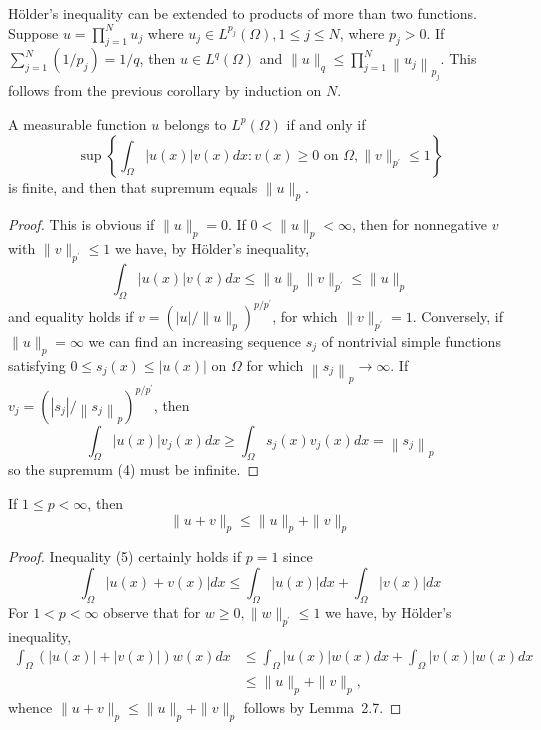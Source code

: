 \begin{corollary}
  Hölder's inequality can be extended to products of more than two functions. Suppose $u=\prod_{j=1}^N u_j$ where $u_j \in L^{p_j}(\Omega), 1 \leq j \leq N$, where $p_j>0$. If $\sum_{j=1}^N\left(1 / p_j\right)=1 / q$, then $u \in L^q(\Omega)$ and $\|u\|_q \leq \prod_{j=1}^N\left\|u_j\right\|_{p_j}$. This follows from the previous corollary by induction on $N$.
\end{corollary}

\begin{lemma}
  A measurable function $u$ belongs to $L^p(\Omega)$ if and only if
  \begin{equation}\label{eq:2.4}
    \sup \left\{\int_{\Omega}|u(x)| v(x) d x: v(x) \geq 0 \text { on } \Omega,\|v\|_{p^{\prime}} \leq 1\right\}
  \end{equation}
  is finite, and then that supremum equals $\|u\|_p$.
\end{lemma}

\begin{proof}
  This is obvious if $\|u\|_p=0$. If $0<\|u\|_p<\infty$, then for nonnegative $v$ with $\|v\|_{p^{\prime}} \leq 1$ we have, by Hölder's inequality,
  \[
  \int_{\Omega}|u(x)| v(x) d x \leq\|u\|_p\|v\|_{p^{\prime}} \leq\|u\|_p
  \]
  and equality holds if $v=\left(|u| /\|u\|_p\right)^{p / p^{\prime}}$, for which $\|v\|_{p^{\prime}}=1$.
  Conversely, if $\|u\|_p=\infty$ we can find an increasing sequence $s_j$ of nontrivial simple functions satisfying $0 \leq s_j(x) \leq|u(x)|$ on $\Omega$ for which $\left\|s_j\right\|_p \rightarrow \infty$. If $v_j=\left(\left|s_j\right| /\left\|s_j\right\|_p\right)^{p / p^{\prime}}$, then
  \[
  \int_{\Omega}|u(x)| v_j(x) d x \geq \int_{\Omega} s_j(x) v_j(x) d x=\left\|s_j\right\|_p
  \]
  so the supremum (4) must be infinite.
\end{proof}


\begin{theorem}
  If $1 \leq p<\infty$, then
  \begin{equation}\label{eq:2.5}
    \|u+v\|_p \leq\|u\|_p+\|v\|_p
  \end{equation}
\end{theorem}

\begin{proof}
  Inequality (5) certainly holds if $p=1$ since
  \[
  \int_{\Omega}|u(x)+v(x)| d x \leq \int_{\Omega}|u(x)| d x+\int_{\Omega}|v(x)| d x
  \]
  For $1<p<\infty$ observe that for $w \geq 0,\|w\|_{p^{\prime}} \leq 1$ we have, by Hölder's inequality,
  \[
  \begin{aligned}
  \int_{\Omega}(|u(x)|+|v(x)|) w(x) d x & \leq \int_{\Omega}|u(x)| w(x) d x+\int_{\Omega}|v(x)| w(x) d x \\
  & \leq\|u\|_p+\|v\|_p,
  \end{aligned}
  \]
  whence $\|u+v\|_p \leq\|u\|_p+\|v\|_p$ follows by Lemma~2.7.
\end{proof}

